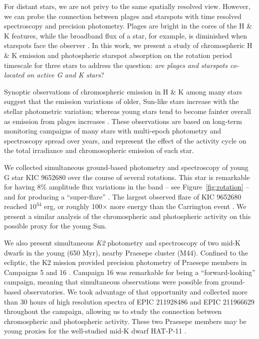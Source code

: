 For distant stars, we are not privy to the same spatially resolved view. However, we can probe the connection between plages and starspots with time resolved spectroscopy and precision photometry. Plages are bright in the cores of the  H \& K features, while the broadband \kepler flux of a star, for example, is diminished when starspots face the observer \citep{Walkowicz2013,McQuillan2013,McQuillan2014,Douglas2014,Douglas2016,Douglas2017}. In this work, we present a study of chromospheric  H \& K emission and photospheric starspot absorption on the rotation period timescale for three stars to address the question: \textit{are plages and starspots co-located on active G and K stars}? 

Synoptic observations of chromospheric emission in  H \& K among many stars suggest that the emission variations of older, Sun-like stars increase with the stellar photometric variation; whereas young stars tend to become fainter overall as emission from plages increases \citep{Radick1998, Radick2018}. These observations are based on long-term monitoring campaigns of many stars with multi-epoch photometry and spectroscopy spread over years, and represent the effect of the activity cycle on the total irradiance and chromosopheric emission of each star. 

We collected simultaneous ground-based photometry and spectroscopy of young G star KIC 9652680 over the course of several rotations. This star is remarkable for having 8\% amplitude flux variations in the \kepler band -- see Figure~\ref{fig:rotation} -- and for producing a ``super-flare'' \citep{Notsu2015a}. The largest observed flare of KIC 9652680 reached $10^{34}$ erg, or roughly 100$\times$ more energy than the Carrington event \citep{Carrington1859, Neuhauser2014, Notsu2015b}. We present a similar analysis of the chromospheric and photospheric activity on this possible proxy for the young Sun. 

We also present simultaneous {\it K2} photometry and spectroscopy of two mid-K dwarfs in the young (650 Myr), nearby Praesepe cluster (M44). Confined to the ecliptic, the K2 mission provided precision photometry of Praesepe members in Campaigns 5 and 16 \citep{k2}. Campaign 16 was remarkable for being a ``forward-looking'' campaign, meaning that simultaneous observations were possible from ground-based observatories. We took advantage of that opportunity and collected more than 30 hours of high resolution spectra of EPIC 211928486 and EPIC 211966629 throughout the campaign, allowing us to study the connection between chromospheric and photospheric activity.  These two Praesepe members may be young proxies for the well-studied mid-K dwarf HAT-P-11 \citep{Deming2011, Sanchis-Ojeda2011, Morris2017a, Morris2017b, Morris2018d}.

